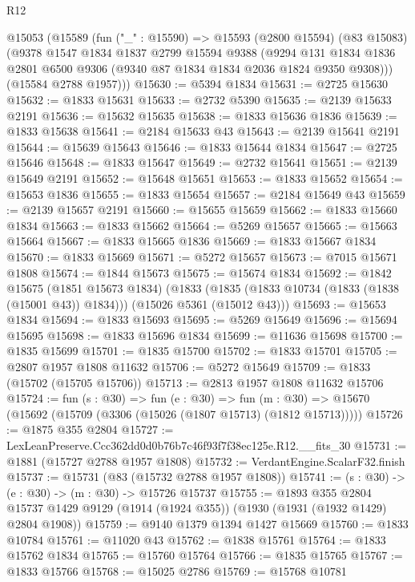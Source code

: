 \begin{lexlean}{R12}
\begin{coremodule}
  @15053
    (@15589
      (fun ("_" : @15590) =>
      @15593
        (@2800 @15594)
        (@83 @15083)
        (@9378
          @1547
          @1834
          @1837
          @2799
          @15594
          @9388
          (@9294
            @131
            @1834
            @1836
            @2801
            @6500
            @9306
            (@9340 @87 @1834 @1834 @2036 @1824 @9350 @9308)))
        (@15584 @2788 @1957)))
@15630 := @5394 @1834
@15631 := @2725 @15630
@15632 := @1833 @15631
@15633 := @2732 @5390
@15635 := @2139 @15633 @2191
@15636 := @15632 @15635
@15638 := @1833 @15636 @1836
@15639 := @1833 @15638
@15641 := @2184 @15633 @43
@15643 := @2139 @15641 @2191
@15644 := @15639 @15643
@15646 := @1833 @15644 @1834
@15647 := @2725 @15646
@15648 := @1833 @15647
@15649 := @2732 @15641
@15651 := @2139 @15649 @2191
@15652 := @15648 @15651
@15653 := @1833 @15652
@15654 := @15653 @1836
@15655 := @1833 @15654
@15657 := @2184 @15649 @43
@15659 := @2139 @15657 @2191
@15660 := @15655 @15659
@15662 := @1833 @15660 @1834
@15663 := @1833 @15662
@15664 := @5269 @15657
@15665 := @15663 @15664
@15667 := @1833 @15665 @1836
@15669 := @1833 @15667 @1834
@15670 := @1833 @15669
@15671 := @5272 @15657
@15673 := @7015 @15671 @1808
@15674 := @1844 @15673
@15675 := @15674 @1834
@15692 := @1842
    @15675
    (@1851 @15673 @1834)
    (@1833 (@1835 (@1833 @10734 (@1833 (@1838 (@15001 @43)) @1834))) (@15026 @5361 (@15012 @43)))
@15693 := @15653 @1834
@15694 := @1833 @15693
@15695 := @5269 @15649
@15696 := @15694 @15695
@15698 := @1833 @15696 @1834
@15699 := @11636 @15698
@15700 := @1835 @15699
@15701 := @1835 @15700
@15702 := @1833 @15701
@15705 := @2807 @1957 @1808 @11632
@15706 := @5272 @15649
@15709 := @1833 (@15702 (@15705 @15706))
@15713 := @2813 @1957 @1808 @11632 @15706
@15724 := fun (s : @30) =>
  fun (e : @30) =>
  fun (m : @30) => @15670 (@15692 (@15709 (@3306 (@15026 (@1807 @15713) (@1812 @15713)))))
@15726 := @1875 @355 @2804
@15727 := LexLeanPreserve.Ccc362dd0d0b76b7c46f93f7f38ec125e.R12.__fits_30
@15731 := @1881 (@15727 @2788 @1957 @1808)
@15732 := VerdantEngine.ScalarF32.finish
@15737 := @15731 (@83 (@15732 @2788 @1957 @1808))
@15741 := (s : @30) -> (e : @30) -> (m : @30) -> @15726 @15737
@15755 := @1893
    @355
    @2804
    @15737
    @1429
    @9129
    (@1914 (@1924 @355))
    (@1930 (@1931 (@1932 @1429) @2804 @1908))
@15759 := @9140 @1379 @1394 @1427 @15669
@15760 := @1833 @10784
@15761 := @11020 @43
@15762 := @1838 @15761
@15764 := @1833 @15762 @1834
@15765 := @15760 @15764
@15766 := @1835 @15765
@15767 := @1833 @15766
@15768 := @15025 @2786
@15769 := @15768 @10781

\end{coremodule}
\end{lexlean}
